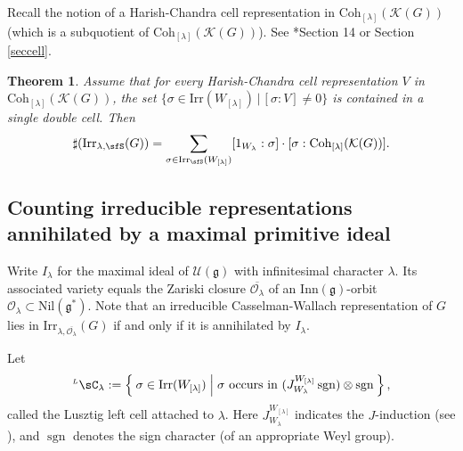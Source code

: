 \documentclass[12pt,a4paper]{amsart}
\newcommand{\CK}{{\mathcal {K}}}
\newcommand{\CO}{{\mathcal {O}}}
\newcommand{\CV}{{\mathcal {V}}}
\newcommand{\sgn}{\operatorname{sgn}}
\newcommand{\g}{\mathfrak g}
\numberwithin{equation}{section}
\newtheorem{thm}{Theorem}[section]
\theoremstyle{remark}
\def\Irr{\mathrm{Irr}}
\def\LC{{}^{\scriptscriptstyle L}\sC}
\def\Coh{\mathrm{Coh}}
\newcommand{\Lam}{{[\lambda]}}
\begin{document}
Recall the notion of a Harish-Chandra cell representation in $\Coh_{\Lam}(\CK(G))$ (which is a subquotient of $\Coh_{\Lam}(\CK(G))$). See \cite{V4}*{Section 14} or Section \ref{seccell}.


 \begin{thm}\label{counteq}
   Assume that for every Harish-Chandra cell representation $V$ in $\Coh_{\Lam}(\CK(G))$, the set $\{\sigma\in \Irr(W_{[\lambda]}) \,|\, [\sigma: V]\neq 0\}$ is contained in a single double cell. Then
  \begin{equation*}%
    \sharp(\Irr_{\lambda,\sfS}(G)) = \sum_{\sigma \in \Irr_\sfS(W_\Lam)} [1_{W_{\lambda}}: \sigma]\cdot [\sigma:\Coh_{\Lam}(\CK(G))].
  \end{equation*}
    \end{thm}






\subsection{Counting irreducible representations annihilated by a maximal primitive ideal}\label{sec13}
Write $I_\lambda$ for the maximal ideal of $\mathcal U(\g)$ with infinitesimal
character $\lambda$. Its associated variety equals the Zariski closure
$\overline{\CO_\lambda}$ of an $\mathrm{Inn}(\g)$-orbit
$\CO_\lambda\subset\mathrm{Nil}(\g^*) $. Note that an irreducible
Casselman-Wallach representation of $G$ lies in
$\Irr_{\lambda,\overline{\CO_\lambda}}(G)$ if and only if it is annihilated by
$I_\lambda$.


Let
\[
  \LC_{\lambda}:= \Set{\sigma\in \Irr(W_\Lam) | \sigma \text{ occurs in $(J_{W_{\lambda}}^{W_{\Lam}} \sgn )\otimes \sgn$}},
\]
called the Lusztig left cell attached to $\lambda$. Here $J_{W_{\lambda}}^{W_{\Lam}} $ indicates the $J$-induction (see \cite[Chapter 12]{Carter}), and $\sgn$
denotes the sign character (of an appropriate Weyl group).
\end{document}
